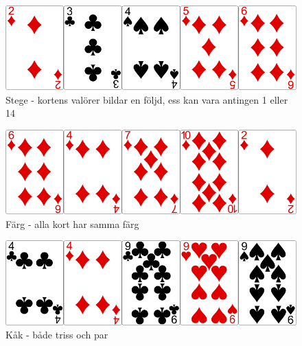 \begin{figure}[H]
 \begin{minipage}[c]{0.5\textwidth}
  \includegraphics[width=\textwidth]{../img/w05-hands/straight.png}
 \end{minipage}
 \begin{minipage}[c]{0.3\textwidth}
  \caption{Stege - kortens valörer bildar en följd, ess kan vara antingen 1 eller 14}
 \end{minipage}
\end{figure}

\begin{figure}[H]
 \begin{minipage}[c]{0.5\textwidth}
  \includegraphics[width=\textwidth]{../img/w05-hands/flush.png}
 \end{minipage}
 \begin{minipage}[c]{0.3\textwidth}
  \caption{Färg - alla kort har samma färg}
 \end{minipage}
\end{figure}

\begin{figure}[H]
 \begin{minipage}[c]{0.5\textwidth}
  \includegraphics[width=\textwidth]{../img/w05-hands/fullhouse.png}
 \end{minipage}
 \begin{minipage}[c]{0.3\textwidth}
  \caption{Kåk - både triss och par}
 \end{minipage}
\end{figure}


